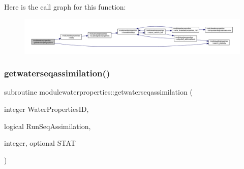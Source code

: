 Here is the call graph for this function\+:\nopagebreak
\begin{figure}[H]
\begin{center}
\leavevmode
\includegraphics[width=350pt]{namespacemodulewaterproperties_aab0b283f67aa51240519cab03610aab7_cgraph}
\end{center}
\end{figure}
\mbox{\label{namespacemodulewaterproperties_afd2b779c6911ab6d6436d6d813a338c7}} 
\subsubsection{\texorpdfstring{getwaterseqassimilation()}{getwaterseqassimilation()}}
{\footnotesize\ttfamily subroutine modulewaterproperties\+::getwaterseqassimilation (\begin{DoxyParamCaption}\item[{integer}]{Water\+Properties\+ID,  }\item[{logical}]{Run\+Seq\+Assimilation,  }\item[{integer, optional}]{S\+T\+AT }\end{DoxyParamCaption})\hspace{0.3cm}{\ttfamily [private]}}

